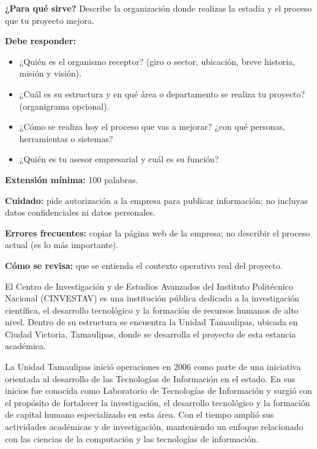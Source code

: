 \begin{guia}
\textbf{¿Para qué sirve?} Describe la organización donde realizas la estadía y el proceso que tu proyecto mejora.

\textbf{Debe responder:}
\begin{itemize}[nosep,leftmargin=*]
  \item ¿Quién es el organismo receptor? (giro o sector, ubicación, breve historia, misión y visión).
  \item ¿Cuál es su estructura y en qué área o departamento se realiza tu proyecto? (organigrama opcional).
  \item ¿Cómo se realiza hoy el proceso que vas a mejorar? ¿con qué personas, herramientas o sistemas?
  \item ¿Quién es tu asesor empresarial y cuál es su función?
\end{itemize}

\textbf{Extensión mínima:} 100 palabras.

\textbf{Cuidado:} pide autorización a la empresa para publicar información; no incluyas datos confidenciales ni
datos personales.

\textbf{Errores frecuentes:} copiar la página web de la empresa; no describir el proceso actual (es lo más importante).

\textbf{Cómo se revisa:} que se entienda el contexto operativo real del proyecto.
\end{guia}


El Centro de Investigación y de Estudios Avanzados del Instituto Politécnico Nacional (CINVESTAV) es una institución pública dedicada a la investigación científica, el desarrollo tecnológico y la formación de recursos humanos de alto nivel. Dentro de su estructura se encuentra la Unidad Tamaulipas, ubicada en Ciudad Victoria, Tamaulipas, donde se desarrolla el proyecto de esta estancia académica.

La Unidad Tamaulipas inició operaciones en 2006 como parte de una iniciativa orientada al desarrollo de las Tecnologías de Información en el estado. En sus inicios fue conocida como Laboratorio de Tecnologías de Información y surgió con el propósito de fortalecer la investigación, el desarrollo tecnológico y la formación de capital humano especializado en esta área. Con el tiempo amplió sus actividades académicas y de investigación, manteniendo un enfoque relacionado con las ciencias de la computación y las tecnologías de información.


